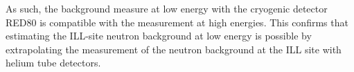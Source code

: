 As such, the background measure at low energy with the cryogenic detector RED80 is compatible with the measurement at high energies. This confirms that estimating the ILL-site neutron background at low energy is possible by extrapolating the measurement of the neutron background at the ILL site with helium tube detectors.



%


%
%

